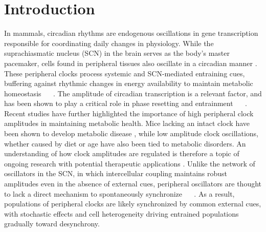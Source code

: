 \documentclass[11pt, letterpaper]{article}
\providecommand{\DIFadd}[1]{{\protect\color{blue}#1}} %
\providecommand{\DIFaddbegin}{} %
\providecommand{\DIFaddend}{} %
\begin{document}
\section*{Introduction}
In mammals, circadian rhythms are endogenous oscillations in gene transcription responsible for coordinating daily changes in physiology.
While the suprachiasmatic nucleus (SCN) in the brain serves as the body's master pacemaker, cells found in peripheral tissues also oscillate in a circadian manner \cite{Lamia2008}.
These peripheral clocks process systemic and SCN-mediated entraining cues, buffering against rhythmic changes in energy availability to maintain metabolic homeostasis \DIFaddbegin \DIFadd{\mbox{%
\cite{Kornmann2007}
}%
.
The amplitude of circadian transcription is a relevant factor, and has been shown to play a critical role in phase resetting and entrainment \mbox{%
\cite{Pittendrigh1991, Abraham2010}
}%
.
Recent studies have further highlighted the }\DIFaddend importance of high peripheral clock amplitudes in maintaining \DIFaddbegin \DIFadd{metabolic health.
Mice }\DIFaddend lacking an intact clock have been shown to develop metabolic disease \cite{Marcheva2010}, while low amplitude clock oscillations, whether caused by diet \cite{Hatori2012} or age \cite{Chang2013} have also been tied to metabolic disorders.
An understanding of how clock amplitudes are regulated is therefore a topic of ongoing research with potential therapeutic applications \cite{St.John2014}.
 Unlike the network of oscillators in the SCN, in which intercellular coupling maintains robust amplitudes even in the absence of external cues, peripheral oscillators are thought to lack a direct mechanism to spontaneously synchronize \DIFaddbegin \DIFadd{\mbox{%
\cite{Welsh2004}
}%
}\DIFaddend .
As a result, populations of peripheral clocks are likely synchronized by common external cues, with stochastic effects and cell heterogeneity driving entrained populations \DIFaddbegin \DIFadd{gradually toward desynchrony}\DIFaddend .
\end{document}
